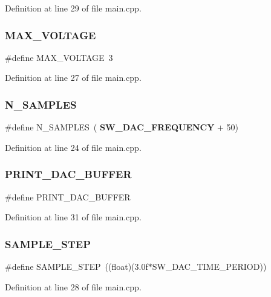 Definition at line 29 of file main.\+cpp.

\mbox{\label{main_8cpp_a0637861f9419cef73e2e7e6210280e4e}} 
\subsubsection{MAX\_VOLTAGE}
{\footnotesize\ttfamily \#define M\+A\+X\+\_\+\+V\+O\+L\+T\+A\+GE~3}



Definition at line 27 of file main.\+cpp.

\mbox{\label{main_8cpp_a864e696e58717460cdb19e5ce8f7ce20}} 
\subsubsection{N\_SAMPLES}
{\footnotesize\ttfamily \#define N\+\_\+\+S\+A\+M\+P\+L\+ES~(\textbf{ S\+W\+\_\+\+D\+A\+C\+\_\+\+F\+R\+E\+Q\+U\+E\+N\+CY} + 50)}



Definition at line 24 of file main.\+cpp.

\mbox{\label{main_8cpp_aa02210b97c039dd968cbd23d508b7ea3}} 
\subsubsection{PRINT\_DAC\_BUFFER}
{\footnotesize\ttfamily \#define P\+R\+I\+N\+T\+\_\+\+D\+A\+C\+\_\+\+B\+U\+F\+F\+ER}



Definition at line 31 of file main.\+cpp.

\mbox{\label{main_8cpp_ab0ad7e747377ae1ac9490e5300c324ea}} 
\subsubsection{SAMPLE\_STEP}
{\footnotesize\ttfamily \#define S\+A\+M\+P\+L\+E\+\_\+\+S\+T\+EP~((float)(3.\+0f$\ast$\+S\+W\+\_\+\+D\+A\+C\+\_\+\+T\+I\+M\+E\+\_\+\+P\+E\+R\+I\+O\+D))}



Definition at line 28 of file main.\+cpp.


